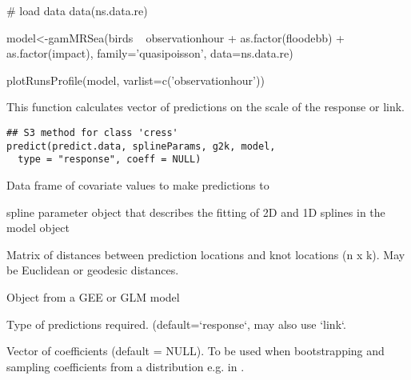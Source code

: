 \documentclass[a4paper]{book}
\begin{document}
%
\begin{Examples}
\begin{ExampleCode}
# load data
data(ns.data.re)

model<-gamMRSea(birds ~ observationhour + as.factor(floodebb) + as.factor(impact), 
            family='quasipoisson', data=ns.data.re)

plotRunsProfile(model, varlist=c('observationhour'))

\end{ExampleCode}
\end{Examples}
%
\begin{Description}\relax
This function calculates vector of predictions on the scale of the response or link.
\end{Description}
%
\begin{Usage}
\begin{verbatim}
## S3 method for class 'cress'
predict(predict.data, splineParams, g2k, model,
  type = "response", coeff = NULL)
\end{verbatim}
\end{Usage}
%
\begin{Arguments}
\begin{ldescription}
\item[\code{predict.data}] Data frame of covariate values to make predictions to

\item[\code{splineParams}] spline parameter object that describes the fitting of 2D and 1D splines in the model object

\item[\code{g2k}] Matrix of distances between prediction locations and knot locations (n x k). May be Euclidean or geodesic distances.

\item[\code{model}] Object from a GEE or GLM model

\item[\code{type}] Type of predictions required. (default=`response`, may also use `link`.

\item[\code{coeff}] Vector of coefficients (default = NULL). To be used when bootstrapping and sampling coefficients from a distribution e.g. in .
\end{ldescription}
\end{Arguments}
\end{document}
